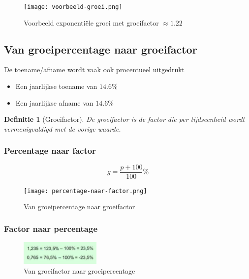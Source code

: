 \documentclass{article}
\newtheorem{theorem}{Definitie}[section]
\begin{document}
\begin{figure}[H]
    \centering
    \texttt{[image: voorbeeld-groei.png]}
    \caption{Voorbeeld exponentiële groei met groeifactor $\approx 1.22$}
\end{figure}


\subsection{Van groeipercentage naar groeifactor}

De toename/afname wordt vaak ook procentueel uitgedrukt

\begin{itemize}
    \item Een jaarlijkse toename van $14.6\%$
    \item Een jaarlijkse afname van $14.6\%$
\end{itemize}

\begin{theorem}[Groeifactor]
De groeifactor is de factor die per tijdseenheid wordt vermenigvuldigd met de vorige waarde.
\end{theorem}

\subsubsection{Percentage naar factor}

\begin{equation}
g = \frac{p + 100}{100}\%
\end{equation} 

\begin{figure}[H]
    \centering
    \texttt{[image: percentage-naar-factor.png]}
    \caption{Van groeipercentage naar groeifactor}
\end{figure}


\subsubsection{Factor naar percentage}

\begin{figure}[H]
    \centering
    \includegraphics[width=0.35\textwidth]{factor-naar-percentage.png}
    \caption{Van groeifactor naar groeipercentage}
\end{figure}
\end{document}
